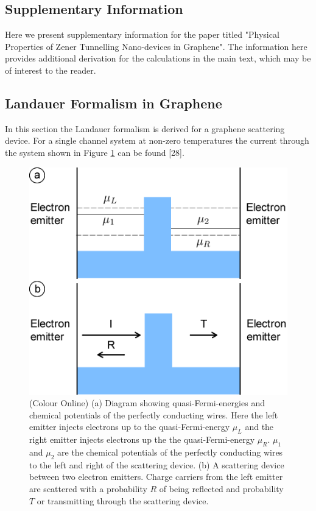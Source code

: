 \documentclass[prl,twocolumn,aps,superscriptaddress,floatfix,10pt]{revtex4}
\begin{document}

	\subsection{Supplementary Information}
	Here we present supplementary information for the paper titled "Physical Properties of Zener Tunnelling Nano-devices in Graphene". The information here provides additional derivation for the calculations in the main text, which may be of interest to the reader.
		\subsection{Landauer Formalism in Graphene}
			In this section the Landauer formalism is derived for a graphene scattering device. For a single channel system at non-zero temperatures the current through the system shown in Figure \ref{introduction-current} can be found [28].
			\begin{figure}[h]
				\centerline{\includegraphics[scale=0.5]{current}}
				\caption{(Colour Online) (a) Diagram showing quasi-Fermi-energies and chemical potentials of the perfectly conducting wires. Here the left emitter injects electrons up to the quasi-Fermi-energy $\mu_{L}$ and the right emitter injects electrons up the the quasi-Fermi-energy $\mu_{R}$. $\mu_{1}$ and $\mu_{2}$ are the chemical potentials of the perfectly conducting wires to the left and right of the scattering device. (b) A scattering device between two electron emitters. Charge carriers from the left emitter are scattered with a probability $R$ of being reflected and probability $T$ or transmitting through the scattering device.}
				\label{introduction-current}
			\end{figure}
\end{document}
